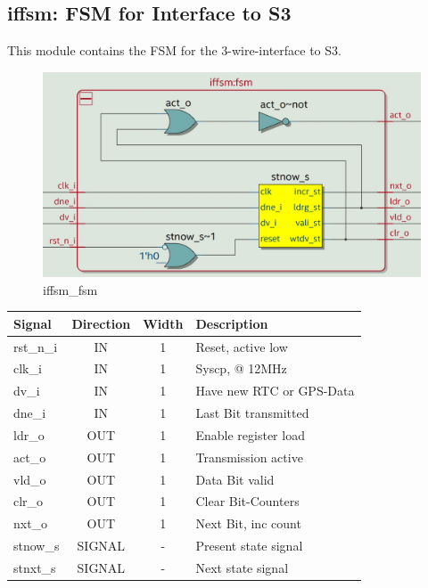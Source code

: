 \documentclass[12pt,a4 paper] {report}
\begin{document}
\subsection{iffsm: FSM for Interface to S3}
This module contains the FSM for the 3-wire-interface to S3.
\begin{figure}[h]
	\centering	
	\includegraphics[scale=0.2]{../png/iffsm_fsm.png}
	\caption{iffsm\_fsm}
\end{figure}
\begin{center}
	\begin{tabular}{ | p{2cm} | c | c | p{5cm} |}
		\hline
		\textbf{Signal} & \textbf{Direction} & \textbf{Width} & \textbf{Description} \\
		\hline
		\hline
		rst\_n\_i & IN & 1 & Reset, active low \\
		\hline
		clk\_i & IN & 1 & Syscp, @ 12MHz \\
		\hline
		dv\_i & IN & 1 & Have new RTC or GPS-Data \\
		\hline
		dne\_i & IN & 1 & Last Bit transmitted \\
		\hline
		ldr\_o & OUT & 1 & Enable register load \\
		\hline
		act\_o & OUT & 1 & Transmission active \\
		\hline
		vld\_o & OUT & 1 & Data Bit valid \\
		\hline
		clr\_o & OUT & 1 & Clear Bit-Counters \\
		\hline
		nxt\_o & OUT & 1 & Next Bit, inc count \\
		\hline
		\hline
		stnow\_s & SIGNAL & - & Present state signal \\
		\hline	
		stnxt\_s & SIGNAL & - & Next state signal \\
		\hline
	\end{tabular}
\end{center}
\end{document}
